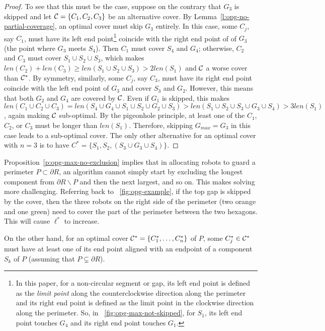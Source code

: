 \begin{proof}
To see that this must be the case, suppose on the contrary that $G_3$ 
is skipped and let $\mathcal C = \{C_1, C_2, C_3\}$ be an alternative cover. 
By Lemma~\ref{l:opg-no-partial-coverage}, an optimal cover must skip $G_3$ 
entirely. In this case, some $C_j$, say $C_1$, must have its left end 
point\footnote{In this paper, for a non-circular segment or gap, its 
left end point is defined as the {\em limit point} along the 
counterclockwise direction along the perimeter and its right end point 
is defined as the limit point in the clockwise direction along the 
perimeter. So, in ~\ref{fig:opg-max-not-skipped}, for $S_1$, its left 
end point touches $G_4$ and its right end point touches $G_1$.} coincide 
with the right end point of of $G_3$ (the point where $G_3$ meets $S_4$). 
Then $C_1$ must cover $S_4$ and $G_4$; otherwise, $C_2$ and $C_3$ must 
cover $S_1 \cup S_2 \cup S_3$, which makes $len(C_2) + len(C_3) \ge 
len(S_1 \cup S_2 \cup S_3) > 2len(S_1)$ and $\mathcal C$ a worse cover than 
$\mathcal C^*$. By symmetry, similarly, some $C_j$, say $C_3$, must have its 
right end point coincide with the left end point of $G_3$ and cover 
$S_3$ and $G_2$. However, this means that both $G_2$ and $G_4$ are 
covered by $\mathcal C$. Even if $G_1$ is skipped, this makes $len(C_1 \cup 
C_2 \cup C_3) = len(S_4 \cup G_4 \cup S_1 \cup S_2 \cup G_2 \cup S_3) 
> len (S_1 \cup S_2 \cup S_3\cup G_3\cup S_4) > 3len(S_1)$, again making
$\mathcal C$ sub-optimal. By the pigeonhole principle, at least one of the $C_1$, 
$C_2$, or $C_3$ must be longer than $len(S_1)$. Therefore, skipping 
$G_{max} = G_3$ in this case leads to a sub-optimal cover. The only 
other alternative for an optimal cover with $n = 3$ is to have $C^* = 
\{S_1, S_2, (S_3\cup G_3\cup S_4)\}$. 
\end{proof}

Proposition~\ref{p:opg-max-no-exclusion} implies that in allocating robots 
to guard a perimeter $P \subset \partial R$, an algorithm cannot simply 
start by excluding the longest component from $\partial R 
\backslash P$ and then the next largest, and so on. This makes solving
\opg more challenging. Referring back to ~\ref{fig:opg-example}, if the 
top gap is skipped by the cover, then the three robots on the right side 
of the perimeter (two orange and one green) need to cover the part of the 
perimeter between the two hexagons. This will cause $\ell^*$ to increase. 

On the other hand, for an optimal cover $\mathcal C^* = \{C_1^*, \ldots, C_n^*\}$ 
of $P$, some $C_j^*\in \mathcal C^*$ must have at least one of its end point 
aligned with an endpoint of a component $S_k$ of $P$ (assuming that $P 
\subsetneq \partial R$). 

